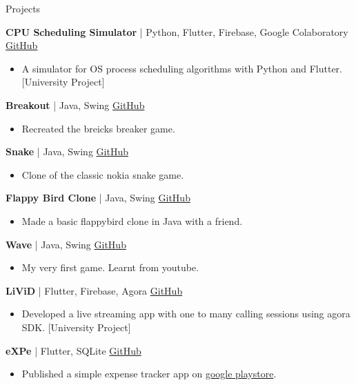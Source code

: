 \documentclass{resume}
\begin{document}
\begin{rSection}{Projects}
\item \textbf{CPU Scheduling Simulator} | {Python, Flutter, Firebase, Google Colaboratory} \hfill \href{https://github.com/JayNakum/OperatingSystemsProject}{GitHub}
\begin{itemize}
    \item A simulator for OS process scheduling algorithms with Python and Flutter. [University Project]
 \end{itemize}

 \item \textbf{Breakout} | {Java, Swing} \hfill \href{https://github.com/JayNakum/Breakout}{GitHub}
\begin{itemize}
     \item Recreated the breicks breaker game.
 \end{itemize}

 \item \textbf{Snake} | {Java, Swing} \hfill \href{https://github.com/JayNakum/Snake}{GitHub}
\begin{itemize}
     \item Clone of the classic nokia snake game.
 \end{itemize}

\item \textbf{Flappy Bird Clone} | {Java, Swing} \hfill \href{https://github.com/Madhav-Parikh/FlappyBird}{GitHub}
\begin{itemize}
     \item Made a basic flappybird clone in Java with a friend.
 \end{itemize}

 \item \textbf{Wave} | {Java, Swing} \hfill \href{https://github.com/JayNakum/Wave}{GitHub}
\begin{itemize}
     \item My very first game. Learnt from youtube.
 \end{itemize}

\item \textbf{LiViD} | {Flutter, Firebase, Agora} \hfill \href{https://github.com/JayNakum/LiViD}{GitHub}
\begin{itemize}
     \item Developed a live streaming app with one to many calling sessions using agora SDK. [University Project]
 \end{itemize}

\item \textbf{eXPe} | {Flutter, SQLite} \hfill \href{https://github.com/JayNakum/eXPe}{GitHub}
\begin{itemize}
     \item Published a simple expense tracker app on \href{https://play.google.com/store/apps/details?id=io.github.jaynakum.expe&pcampaignid=pcampaignidMKT-Other-global-all-co-prtnr-py-PartBadge-Mar2515-1}{google playstore}.\\
 \end{itemize}
\end{rSection}
\end{document}
